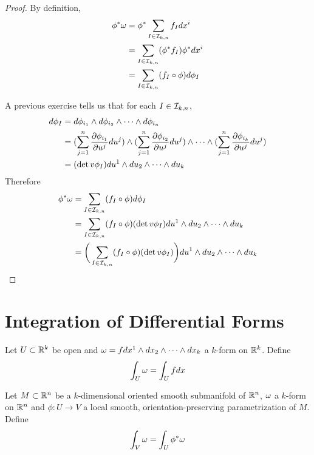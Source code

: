 \documentclass{book}
\begin{document}
	\begin{proof}
		By definition,  
		\begin{align*}
			\phi^* \omega 
			&= \phi^*  \sum_{I \in \mathcal{I}_{k,n}} f_Idx^i \\
			&= \sum_{I \in \mathcal{I}_{k,n}} (\phi^*f_I) \phi^*dx^i \\
			&= \sum_{I \in \mathcal{I}_{k,n}} (f_I \circ  \phi)  d\phi_I
		\end{align*}
	
	A previous exercise tells us that for each $I \in \mathcal{I}_{k,n}$,
	\begin{align*}
		d \phi_I 
		&= d\phi_{i_1} \wedge d\phi_{i_2} \wedge \cdots \wedge d \phi_{i_n} \\
		&= (\sum_{j = 1}^n \frac{\partial \phi_{i_1}}{\partial u^j} du^j) \wedge (\sum_{j = 1}^n \frac{\partial \phi_{i_2}}{\partial u^j} du^j) \wedge \cdots \wedge (\sum_{j = 1}^n\frac{\partial \phi_{i_k}}{\partial u^j}du^j)   \\
		&= (\det v\phi_I)du^1 \wedge du_2 \wedge \cdots \wedge du_k
	\end{align*}
	Therefore 
	\begin{align*}
		\phi^* \omega
		&= \sum_{I \in \mathcal{I}_{k,n}} (f_I \circ  \phi)  d\phi_I \\
		&= \sum_{I \in \mathcal{I}_{k,n}} (f_I \circ  \phi)  (\det v\phi_I)du^1 \wedge du_2 \wedge \cdots \wedge du_k \\
		&= \bigg(\sum_{I \in \mathcal{I}_{k,n}} (f_I \circ  \phi)  (\det v\phi_I)\bigg)du^1 \wedge du_2 \wedge \cdots \wedge du_k
	\end{align*}
	\end{proof}
	
	\section{Integration of Differential Forms}
	
	\begin{defn}
		Let $U \subset \mathbb{R}^k$ be open and $\omega = f dx^1 \wedge dx_2 \wedge \cdots \wedge dx_k$ a $k$-form on $\mathbb{R}^k$. Define $$\int_U \omega = \int_U f dx$$
	\end{defn}
	
	\begin{defn}
		Let $M \subset \mathbb{R}^n$ be a $k$-dimensional oriented smooth submanifold of $\mathbb{R}^n$, $\omega$ a $k$-form on $\mathbb{R}^n$ and $\phi: U \rightarrow V$ a local smooth, orientation-preserving parametrization of $M$. Define $$\int_V \omega = \int_U \phi^*\omega $$
	\end{defn} 

	\begin{ex}
		
	\end{ex}
\end{document}
